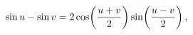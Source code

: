 \[\mathop{\sin\/}\nolimits u-\mathop{\sin\/}\nolimits v=2\mathop{\cos\/}%
\nolimits\!\left(\frac{u+v}{2}\right)\mathop{\sin\/}\nolimits\!\left(\frac{u-v%
}{2}\right),\]
